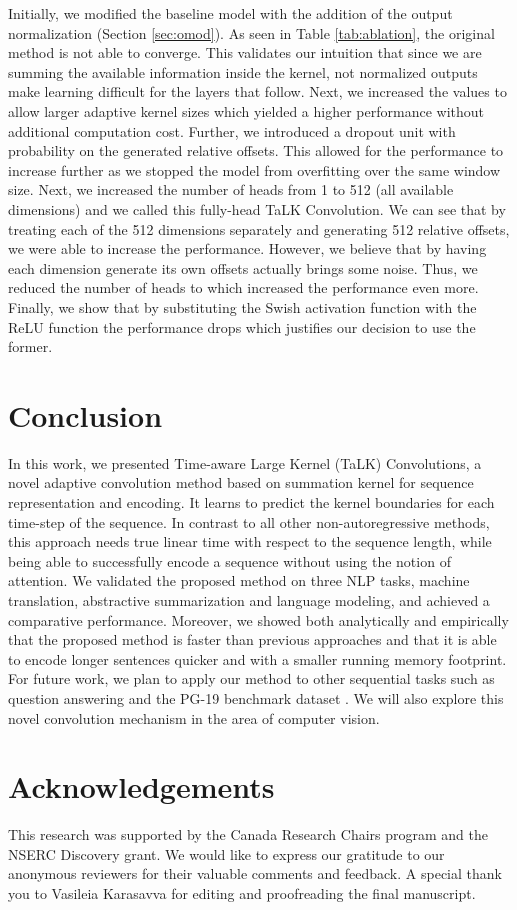 \documentclass{article}
\def\talkfullsabbr{Time-aware Large Kernel (TaLK) Convolutions}
\def\talkconvfull{TaLK Convolution}
\begin{document}
Initially, we modified the baseline model with the addition of the output normalization (Section \ref{sec:omod}). As seen in Table \ref{tab:ablation}, the original method is not able to converge. This validates our intuition that since we are summing the available information inside the kernel, not normalized outputs make learning difficult for the layers that follow. Next, we increased the values  to allow larger adaptive kernel sizes which yielded a higher performance without additional computation cost. Further, we introduced a dropout unit with probability  on the generated relative offsets. This allowed for the performance to increase further as we stopped the model from overfitting over the same window size. Next, we increased the number of heads  from 1 to 512 (all available dimensions) and we called this fully-head \talkconvfull{}. We can see that by treating each of the 512 dimensions separately and generating 512 relative offsets, we were able to increase the performance. However, we believe that by having each dimension generate its own offsets actually brings some noise. Thus, we reduced the number of heads to  which increased the performance even more. Finally, we show that by substituting the Swish activation function with the ReLU function the performance drops which justifies our decision to use the former.

\section{Conclusion}
In this work, we presented \talkfullsabbr{}, a novel adaptive convolution method based on summation kernel for sequence representation and encoding. It learns to predict the kernel boundaries for each time-step of the sequence. In contrast to all other non-autoregressive methods, this approach needs true linear time  with respect to the sequence length, while being able to successfully encode a sequence without using the notion of attention. We validated the proposed method on three NLP tasks, machine translation, abstractive summarization and language modeling, and achieved a comparative performance. Moreover, we showed both analytically and empirically that the proposed method is faster than previous approaches and that it is able to encode longer sentences quicker and with a smaller running memory footprint. For future work, we plan to apply our method to other sequential tasks such as question answering and the PG-19 benchmark dataset \cite{Rae2020Compressive}. We will also explore this novel convolution mechanism in the area of computer vision.

\section*{Acknowledgements}
This research was supported by the Canada Research Chairs program and the NSERC Discovery grant. We would like to express our gratitude to our anonymous reviewers for their valuable comments and feedback. A special thank you to Vasileia Karasavva for editing and proofreading the final manuscript.



\end{document}
